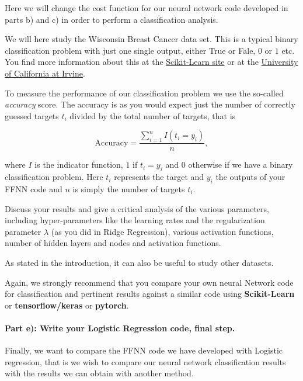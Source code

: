 \documentclass[%
oneside,                 %
final,                   %
10pt]{article}
\begin{document}
Here we will change the cost function for our neural network code
developed in parts b) and c) in order to perform a classification analysis. 

We will here study the Wisconsin Breast Cancer  data set. This is a typical binary classification problem with just one single output, either True or Fale, $0$ or $1$ etc.
You find more information about this at the \href{{https://scikit-learn.org/stable/modules/generated/sklearn.datasets.load_breast_cancer.html}}{Scikit-Learn
site} or at the \href{{https://archive.ics.uci.edu/ml/datasets/breast+cancer+wisconsin+(original)}}{University of California
at Irvine}. 


To measure the performance of our classification problem we use the
so-called \emph{accuracy} score.  The accuracy is as you would expect just
the number of correctly guessed targets $t_i$ divided by the total
number of targets, that is 


\[ 
\text{Accuracy} = \frac{\sum_{i=1}^n I(t_i = y_i)}{n} ,
\]

where $I$ is the indicator function, $1$ if $t_i = y_i$ and $0$
otherwise if we have a binary classification problem. Here $t_i$
represents the target and $y_i$ the outputs of your FFNN code and $n$ is simply the number of targets $t_i$.

Discuss your results and give a critical analysis of the various parameters, including hyper-parameters like the learning rates and the regularization parameter $\lambda$ (as you did in Ridge Regression), various activation functions, number of hidden layers and nodes and activation functions.  


As stated in the introduction, it can also be useful to study other
datasets. 

Again, we strongly recommend that you compare your own neural Network
code for classification and pertinent results against a similar code using \textbf{Scikit-Learn}  or \textbf{tensorflow/keras} or \textbf{pytorch}.





\paragraph{Part e): Write your Logistic Regression code, final step.}
Finally, we want to compare the FFNN code we have developed with
Logistic regression, that is we wish to compare our neural network
classification results with the results we can obtain with another
method.
\end{document}
